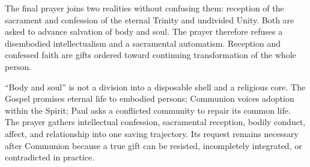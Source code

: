 The final prayer joins two realities without confusing them: reception of the sacrament and confession of the eternal Trinity and undivided Unity. Both are asked to advance salvation of body and soul. The prayer therefore refuses a disembodied intellectualism and a sacramental automatism. Reception and confessed faith are gifts ordered toward continuing transformation of the whole person.

“Body and soul” is not a division into a disposable shell and a religious core. The Gospel promises eternal life to embodied persons; Communion voices adoption within the Spirit; Paul asks a conflicted community to repair its common life. The prayer gathers intellectual confession, sacramental reception, bodily conduct, affect, and relationship into one saving trajectory. Its request remains necessary after Communion because a true gift can be resisted, incompletely integrated, or contradicted in practice.
